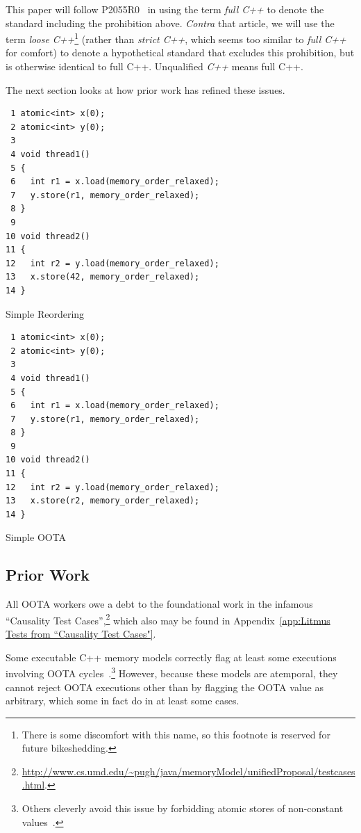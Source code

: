 \documentclass[10]{article}
\begin{document}
This paper will follow P2055R0~\cite{PaulEMcKenney2020RelaxedGuideRelaxed}
in using the term \emph{full C++} to denote the standard including the
prohibition above.
{\it Contra\/} that article, we will use the term \emph{loose C++}\footnote{
	There is some discomfort with this name, so this footnote
	is reserved for future bikeshedding.}
(rather than \emph{strict C++}, which seems too similar to
\emph{full C++} for comfort)
to denote a hypothetical standard that excludes this prohibition, but
is otherwise identical to full C++.
Unqualified \emph{C++} means full C++.

The next section looks at how prior work has refined these issues.

\begin{listing}[tbp]
\begin{verbatim}
 1 atomic<int> x(0);
 2 atomic<int> y(0);
 3
 4 void thread1()
 5 {
 6   int r1 = x.load(memory_order_relaxed);
 7   y.store(r1, memory_order_relaxed);
 8 }
 9
10 void thread2()
11 {
12   int r2 = y.load(memory_order_relaxed);
13   x.store(42, memory_order_relaxed);
14 }
\end{verbatim}
\caption{Simple Reordering}
\label{lst:Simple Reordering}
\end{listing}

\begin{listing}[tbp]
\begin{verbatim}
 1 atomic<int> x(0);
 2 atomic<int> y(0);
 3
 4 void thread1()
 5 {
 6   int r1 = x.load(memory_order_relaxed);
 7   y.store(r1, memory_order_relaxed);
 8 }
 9
10 void thread2()
11 {
12   int r2 = y.load(memory_order_relaxed);
13   x.store(r2, memory_order_relaxed);
14 }
\end{verbatim}
\caption{Simple OOTA}
\label{lst:Simple OOTA}
\end{listing}

\subsection{Prior Work}
\label{sec:Prior Work}

All OOTA workers owe a debt to the foundational work in the infamous
``Causality Test Cases'',\footnote{
	\url{http://www.cs.umd.edu/~pugh/java/memoryModel/unifiedProposal/testcases.html}.}
which also may be found in
Appendix~\ref{app:Litmus Tests from “Causality Test Cases"}.

Some executable C++ memory models correctly flag at least some executions
involving OOTA cycles~\cite{JadeAlglave2014HerdingCats}.\footnote{
	Others cleverly avoid this issue by forbidding atomic
	stores of non-constant values~\cite{MarkBatty2011cppmem}.}
However, because these models are atemporal, they cannot reject
OOTA executions other than by flagging the OOTA value as arbitrary,
which some in fact do in at least some cases.
\end{document}
